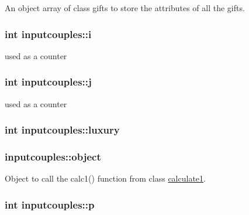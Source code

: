 An object array of class gifts to store the attributes of all the gifts. 

\hypertarget{classinputcouples_a37d4b84f90a165909017702a679806b0}{
\subsubsection[{i}]{\setlength{\rightskip}{0pt plus 5cm}int inputcouples\-::i}}\label{classinputcouples_a37d4b84f90a165909017702a679806b0}


used as a counter 

\hypertarget{classinputcouples_aaad2a14fc62c100f5a96e20259733949}{
\subsubsection[{j}]{\setlength{\rightskip}{0pt plus 5cm}int inputcouples\-::j}}\label{classinputcouples_aaad2a14fc62c100f5a96e20259733949}


used as a counter 

\hypertarget{classinputcouples_a6f9e3f541571e3183e95f91e9c53d076}{
\subsubsection[{luxury}]{\setlength{\rightskip}{0pt plus 5cm}int inputcouples\-::luxury}}\label{classinputcouples_a6f9e3f541571e3183e95f91e9c53d076}
\hypertarget{classinputcouples_a801870812607dfc59b61a16b36fe17ac}{
\subsubsection[{object}]{ inputcouples\-::object}}\label{classinputcouples_a801870812607dfc59b61a16b36fe17ac}


Object to call the calc1() function from class \hyperlink{classcalculate1}{calculate1}. 

\hypertarget{classinputcouples_a095ea8a7e9628d304a22edaf37c016dd}{
\subsubsection[{p}]{\setlength{\rightskip}{0pt plus 5cm}int inputcouples\-::p}}\label{classinputcouples_a095ea8a7e9628d304a22edaf37c016dd}


